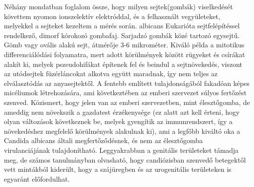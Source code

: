 {Néhány mondatban foglalom össze, hogy milyen sejtek(gombák) viselkedését követtem nyomon ionszelektív elektróddal, és a felhasznált vegyületeket, melyekkel a sejteket kezeltem a mérés során.
\sectionCandida albicans
Eukarióta sejtfelépítéssel rendelkező, dimorf kórokozó gombafaj. Sarjadzó gombák közé tartozó egysejtű. Gömb vagy ovális alakú sejt, átmérője 3-6 mikrométer. Kiváló példa a mitotikus differenciálódási folyamatra, mert adott körülmények között rügyeket és csírákat alakít ki, melyek pszeudohifákat építenek fel és beindul a sejtnövekedés, viszont az utódsejtek füzérláncokat alkotva együtt maradnak, így nem teljes az elválasztódás az anyasejtektől.
 A fentebb említett tulajdonságából fakadóan képes micéliumok létrehozására, ami következtében az emberi szervezet súlyos fertőzést szenved. 
Közismert, hogy jelen van az emberi szervezetben, mint élesztőgomba, de ameddig nem növekszik a gazdatest érzékenysége (ez alatt azt kell érteni, hogy olyan változások következnek be, melyek gyengítik az immunrendszert, így a növekedéshez megfelelő körülmények alakulnak ki), ami a legfőbb kiváltó oka a Candida albicans általi megfertőződésnek, és nem az élesztőgomba virulanciájának tulajdonítható. Leggyakrabban a genitális területeket támadja meg, de számos tanulmányban olvasható, hogy candiózisban szenvedő betegektől vett mintákból kiderült, hogy a szájüregben és az urogenitális területeken is egyaránt előfordulhat. 
\sectionNystatin
}

